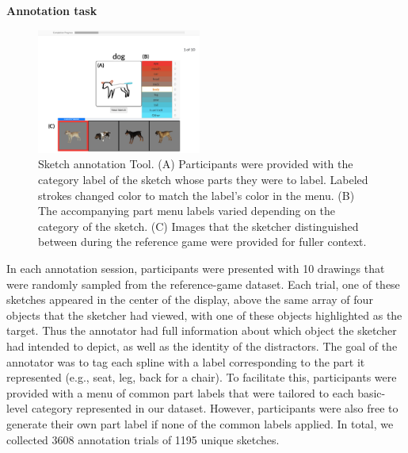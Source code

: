 \documentclass[10pt,letterpaper]{article}
\newcommand{\jefan}[1]{{\color{blue}{[jefan: #1]}}}
\begin{document}
\noindent \textbf{Annotation task} \hspace{3mm} \jefan{Would be good to put a cleaned up version of the annotation task interface around here.} 

\begin{figure}[htbp]
\centering
\includegraphics[width=0.48\textwidth]{figures/annotation_tool.pdf}
\caption{Sketch annotation Tool. (A) Participants were provided with the category label of the sketch whose parts they were to label. Labeled strokes changed color to match the label's color in the menu. (B) The accompanying part menu labels varied depending on the category of the sketch. (C) Images that the sketcher distinguished between during the reference game were provided for fuller context.}
\label{refgame_performance}
\end{figure}

In each annotation session, participants were presented with 10 drawings that were randomly sampled from the reference-game dataset. 
Each trial, one of these sketches appeared in the center of the display, above the same array of four objects that the sketcher had viewed, with one of these objects highlighted as the target. 
Thus the annotator had full information about which object the sketcher had intended to depict, as well as the identity of the distractors. 
The goal of the annotator was to tag each spline with a label corresponding to the part it represented (e.g., seat, leg, back for a chair). 
To facilitate this, participants were provided with a menu of common part labels that were tailored to each basic-level category represented in our dataset. \jefan{It would be good to have a table containing the part labels that were provided for each category.}
However, participants were also free to generate their own part label if none of the common labels applied.
In total, we collected 3608 annotation trials of 1195 unique sketches. \jefan{What happened to the other 3 drawings? See top of `Drawing dataset' subsection.}
\end{document}
